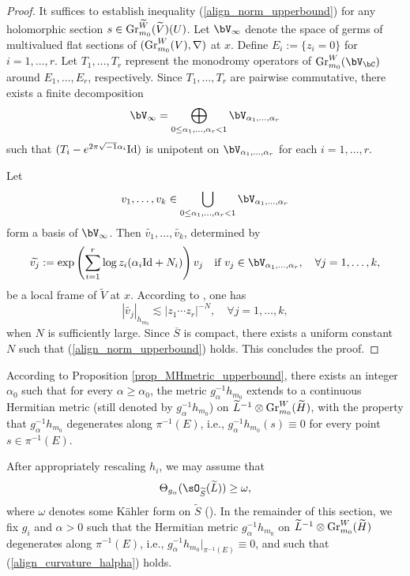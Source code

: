 \documentclass[11pt,letterpaper]{amsart}
\numberwithin{equation}{section}
\begin{document}
	\begin{proof}    	
		It suffices to establish inequality (\ref{align_norm_upperbound}) for any holomorphic section $s \in {\rm Gr}^{\widetilde{W}}_{m_0}(\widetilde{V})(U)$. Let $\bV_\infty$ denote the space of germs of multivalued flat sections of $({\rm Gr}^W_{m_0}(V), \nabla)$ at $x$. Define $E_i := \{z_i = 0\}$ for $i = 1, \dots, r$. Let $T_1, \dots, T_r$ represent the monodromy operators of ${\rm Gr}^W_{m_0}(\bV_{\bC})$ around $E_1, \dots, E_r$, respectively. Since $T_1, \dots, T_r$ are pairwise commutative, there exists a finite decomposition  
		$$
		\bV_\infty = \bigoplus_{0 \leq \alpha_1, \dots, \alpha_r < 1} \bV_{\alpha_1, \dots, \alpha_r}
		$$  
		such that $(T_i - e^{2\pi\sqrt{-1}\alpha_i}{\rm Id})$ is unipotent on $\bV_{\alpha_1, \dots, \alpha_r}$ for each $i = 1, \dots, r$.  
		
		Let  
		$$
		v_1, \dots, v_k \in \bigcup_{0 \leq \alpha_1, \dots, \alpha_r < 1} \bV_{\alpha_1, \dots, \alpha_r}
		$$  
		form a basis of $\bV_\infty$. Then $\widetilde{v_1}, \dots, \widetilde{v_k}$, determined by  
		\begin{align}\label{align_adapted_frame}  
			\widetilde{v_j} := {\rm exp}\left(\sum_{i=1}^r \log z_i (\alpha_i{\rm Id} + N_i)\right)v_j \quad \text{if } v_j \in \bV_{\alpha_1, \dots, \alpha_r}, \quad \forall j = 1, \dots, k,
		\end{align}  
		be a local frame of $\widetilde{V}$ at $x$. According to \cite[Theorem 5.21]{Cattani_Kaplan_Schmid1986}, one has  
		$$
		|\widetilde{v_j}|_{h_{m_0}} \lesssim |z_1 \cdots z_r|^{-N}, \quad \forall j = 1, \dots, k,
		$$  
		when $N$ is sufficiently large. Since $\overline{S}$ is compact, there exists a uniform constant $N$ such that (\ref{align_norm_upperbound}) holds. This concludes the proof.
	\end{proof}
	According to Proposition \ref{prop_MHmetric_upperbound}, there exists an integer $\alpha_0$ such that for every $\alpha \geq \alpha_0$, the metric $g_{\alpha}^{-1} h_{m_0}$ extends to a continuous Hermitian metric (still denoted by $g_{\alpha}^{-1} h_{m_0}$) on $\widetilde{L}^{-1} \otimes {\rm Gr}^W_{m_0}(\widetilde{H})$, with the property that $g_{\alpha}^{-1} h_{m_0}$ degenerates along $\pi^{-1}(E)$, i.e., $g_{\alpha}^{-1} h_{m_0}(s) \equiv 0$ for every point $s \in \pi^{-1}(E)$.
	
	After appropriately rescaling $h_i$, we may assume that  
	\begin{align}\label{align_curvature_halpha}  
		\Theta_{g_{\alpha}}(\sO_{\widetilde{S}}(\widetilde{L})) \geq \omega,  
	\end{align}  
	where $\omega$ denotes some K\"ahler form on $\widetilde{S}$ (\cite[Lemma 2.16]{DLSZ}). In the remainder of this section, we fix $g_i$ and $\alpha > 0$ such that the Hermitian metric $g_{\alpha}^{-1} h_{m_0}$ on $\widetilde{L}^{-1} \otimes {\rm Gr}^W_{m_0}(\widetilde{H})$ degenerates along $\pi^{-1}(E)$, i.e., $g_{\alpha}^{-1} h_{m_0}|_{\pi^{-1}(E)} \equiv 0$, and such that (\ref{align_curvature_halpha}) holds.
\end{document}
